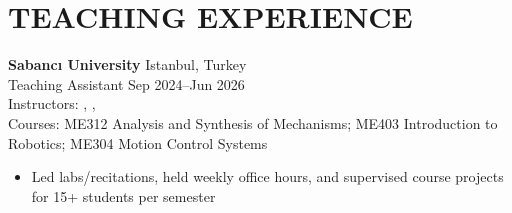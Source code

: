 \section*{TEACHING EXPERIENCE}

\textbf{Sabancı University} \hfill Istanbul, Turkey\\
Teaching Assistant \hfill Sep 2024--Jun 2026\\
Instructors: , , \\
Courses: ME312 Analysis and Synthesis of Mechanisms; ME403 Introduction to Robotics; ME304 Motion Control Systems
\begin{itemize}
  \item Led labs/recitations, held weekly office hours, and supervised course projects for 15+ students per semester
\end{itemize}
